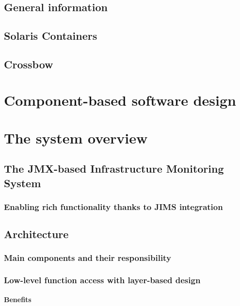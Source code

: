\documentclass[11pt]{book}
\begin{document}
    \section{General information}


    \section{Solaris Containers}


    \section{Crossbow}


  \chapter{Component-based software design}


  \chapter{The system overview}

    \section{The JMX-based Infrastructure Monitoring System}


    \subsection{Enabling rich functionality thanks to JIMS integration}


    \section{Architecture}

      \subsection{Main components and their responsibility}


      \subsection{Low-level function access with layer-based design}

        \subsubsection{Benefits}
\end{document}
